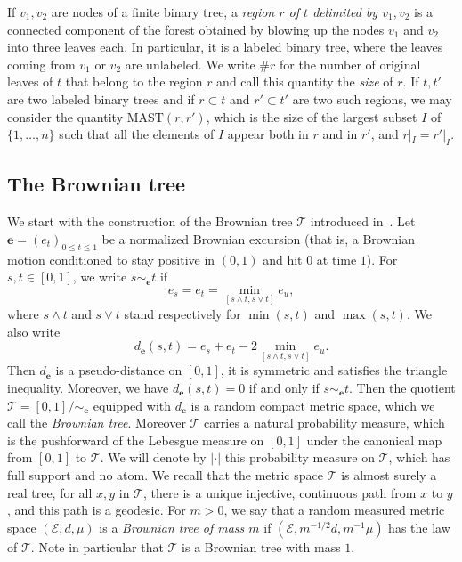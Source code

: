 \documentclass[JEP,XML,SOM,Unicode,NoFloatCountersInSection,published]{cedram}
\newcommand{\bme}{\mathbf{e}}
\newcommand{\MAST}{\mathrm{MAST}}
\newcommand{\Tt}{\mathcal{T}}
\theoremstyle{plain}
\theoremstyle{definition}
\begin{document}
If $v_1, v_2$ are nodes of a finite binary tree, a \emph{region $r$ of $t$ delimited by $v_1, v_2$} is a connected component of the forest obtained by blowing up the nodes $v_1$ and $v_2$ into three leaves each. In particular, it is a labeled binary tree, where the leaves coming from $v_1$ or $v_2$ are unlabeled.
We write $\# r$ for the number of original leaves of $t$ that belong to the region $r$ and call this quantity the \emph{size} of $r$.
If $t,t'$ are two labeled binary trees and if $r \subset t$ and $r' \subset t'$ are two such regions, we may consider the quantity $\MAST(r,r')$, which is the size of the largest subset $I$ of $\{1,\dots,n\}$ such that all the elements of $I$ appear both in $r$ and in $r'$, and $r|_I=r'|_I$.

\subsection{The Brownian tree}\label{subsec:BCRT}

We start with the construction of the Brownian tree $\Tt$ introduced in~\cite{Ald91, Ald93}. Let $\mathbf{e}=(e_t)_{0 \leq t \leq 1}$ be a normalized Brownian excursion (that is, a Brownian motion conditioned to stay positive in $(0,1)$ and hit $0$ at time $1$). For $s,t \in [0,1]$, we write $s \sim_{\bme} t$ if\vspace*{-3pt}
\[ e_s=e_t=\min_{[s \wedge t, s \vee t]} e_u,\]
where $s \wedge t$ and $s \vee t$ stand respectively for $\min(s,t)$ and $\max(s,t)$.
We also write\vspace*{-3pt}
\[ d_{\bme}(s,t)=e_s+e_t-2 \min_{[s \wedge t, s \vee t]} e_u. \]
Then $d_{\bme}$ is a pseudo-distance on $[0,1]$, \ie it is symmetric and satisfies the triangle inequality. Moreover, we have $d_{\bme}(s,t)=0$ if and only if $s \sim_{\bme} t$.
Then the quotient $\Tt=[0,1] / \sim_{\bme}$ equipped with $d_{\bme}$ is a random compact metric space, which we call the \emph{Brownian tree}.
Moreover $\Tt$ carries a natural probability measure, which is the pushforward of the Lebesgue measure on $[0,1]$ under the canonical map from $[0,1]$ to $\Tt$.
We will denote by $|\cdot |$ this probability measure on $\Tt$, which has full support and no atom.
We recall that the metric space $\Tt$ is almost surely a real tree, \ie for all $x,y$ in $\Tt$, there is a unique injective, continuous path from $x$ to $y$, and this path is a geodesic.
For $m>0$, we say that a random measured metric space $(\mathcal{E},d,\mu)$ is a \emph{Brownian tree of mass $m$} if $(\mathcal{E}, m^{-1/2}d, m^{-1}\mu)$ has the law of $\Tt$.
Note in particular that $\Tt$ is a Brownian tree with mass $1$.
\end{document}
